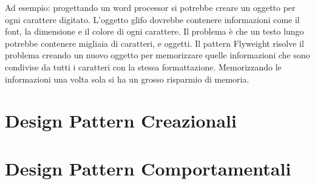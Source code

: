 Ad esempio: progettando un word processor si potrebbe creare un oggetto per ogni carattere digitato. L'oggetto glifo dovrebbe contenere informazioni come il font, la dimensione e il colore di ogni carattere. Il problema è che un testo lungo potrebbe contenere migliaia di caratteri, e oggetti. Il pattern Flyweight risolve il problema creando un nuovo oggetto per memorizzare quelle informazioni che sono condivise da tutti i caratteri con la stessa formattazione. Memorizzando le informazioni una volta sola si ha un grosso risparmio di memoria.
\section{Design Pattern Creazionali}

\section{Design Pattern Comportamentali}


